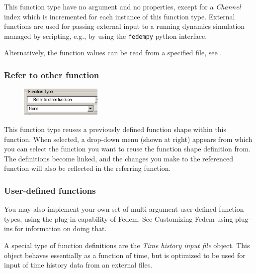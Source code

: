 
This function type have no argument and no properties, except for a
{\sl Channel} index which is incremented for each instance of this
function type. External functions are used for passing external input to
a running dynamics simulation managed by scripting, e.g., by using the
{\tt fedempy} python interface.

Alternatively, the function values can be read from a specified file, see
.

\subsubsection{Refer to other function}

\begin{figure}
  \vspace{-5mm}
  \includegraphics[width=0.35\textwidth]{Figures/4-Refer_to_function}
\end{figure}

This function type reuses a previously defined function shape within this
function. When selected, a drop-down menu (shown at right)
appears from which you can select the function you want to reuse the
function shape definition from. The definitions become linked, and the
changes you make to the referenced function will also be reflected in
the referring function.

\subsubsection{User-defined functions}

You may also implement your own set of multi-argument user-defined
function types, using the plug-in capability of Fedem.
See 
{Customizing Fedem using plug-ins} for information on doing that.



A special type of function definitions are the {\sl Time history input file}
object. This object behaves essentially as a function of time, but is optimized
to be used for input of time history data from an external files.

